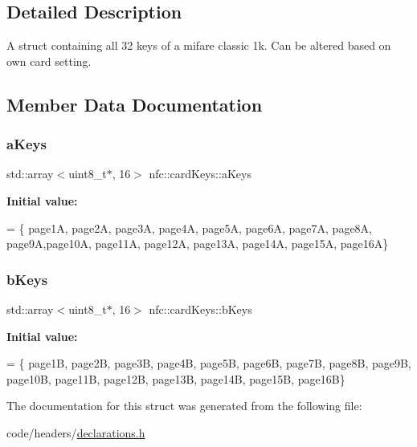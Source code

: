 \subsection{Detailed Description}
A struct containing all 32 keys of a mifare classic 1k. Can be altered based on own card setting. 

\subsection{Member Data Documentation}
\mbox{\label{structnfc_1_1cardKeys_a0da9cb1c04058105670787e3e1cb70fa}} 
\subsubsection{\texorpdfstring{a\+Keys}{aKeys}}
{\footnotesize\ttfamily std\+::array$<$uint8\+\_\+t$\ast$, 16$>$ nfc\+::card\+Keys\+::a\+Keys}

{\bfseries Initial value\+:}
\begin{DoxyCode}
= \{
                page1A, page2A, page3A, page4A, page5A,
                page6A, page7A, page8A, page9A,page10A,
                page11A, page12A, page13A, page14A, page15A, 
                page16A\}
\end{DoxyCode}
\mbox{\label{structnfc_1_1cardKeys_a955e03f93bc451e989fd25ac8948616c}} 
\subsubsection{\texorpdfstring{b\+Keys}{bKeys}}
{\footnotesize\ttfamily std\+::array$<$uint8\+\_\+t$\ast$, 16$>$ nfc\+::card\+Keys\+::b\+Keys}

{\bfseries Initial value\+:}
\begin{DoxyCode}
= \{
                page1B, page2B, page3B, page4B, page5B, 
                page6B, page7B, page8B, page9B, page10B, 
                page11B, page12B, page13B, page14B, page15B, 
                page16B\}
\end{DoxyCode}


The documentation for this struct was generated from the following file\+:\begin{DoxyCompactItemize}
\item 
code/headers/\hyperlink{declarations_8h}{declarations.\+h}\end{DoxyCompactItemize}
